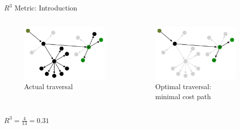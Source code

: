 \begin{frame}{$R^{3}$ Metric: Introduction}
  \centering
  \begin{columns}[c]
    \begin{figure}
      \includegraphics[width=\linewidth]{images/r3-metric-bad-traversal.pdf}
      \caption{\small Actual traversal}
    \end{figure}

    \begin{figure}
      \includegraphics[width=\linewidth]{images/r3-metric-good-traversal.pdf}
      \caption{\small Optimal traversal: minimal cost path}
    \end{figure}
  \end{columns}

  \vspace{1em}
  \small $ R^{3} = \frac{4}{13} = 0.31$
\end{frame}